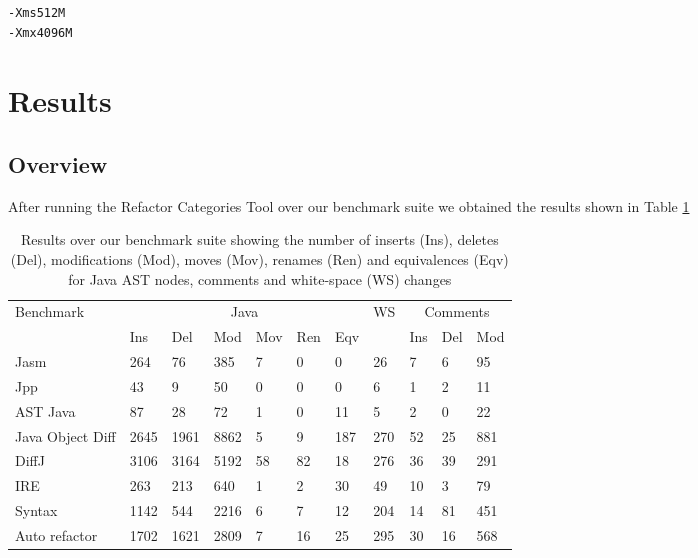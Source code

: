 \begin{verbatim}
-Xms512M 
-Xmx4096M
\end{verbatim}



\section{Results}
\subsection{Overview}
After running the Refactor Categories Tool over our benchmark suite we obtained the results shown in Table \ref{tab:results}

\begin{table}[!p]
    \small
    \begin{tabular}{l|llllll|l|lll}
    Benchmark        & \multicolumn{6}{|c|}{Java}           & WS & \multicolumn{3}{|c}{Comments} \\ \cline{2-7} \cline{9-11}
    ~                & Ins  & Del  & Mod  & Mov & Ren & Eqv & ~          & Ins      & Del & Mod  \\ \hline
    Jasm             & 264  & 76   & 385  & 7   & 0   & 0   & 26         & 7        & 6   & 95   \\
    Jpp              & 43   & 9    & 50   & 0   & 0   & 0   & 6          & 1        & 2   & 11   \\
    AST Java         & 87   & 28   & 72   & 1   & 0   & 11  & 5          & 2        & 0   & 22   \\
    \begin{minipage}[t]{0.15\textwidth}Java Object Diff\end{minipage} & 2645 & 1961 & 8862 & 5   & 9   & 187 & 270        & 52       & 25 & 881 \\
    DiffJ            & 3106 & 3164 & 5192 & 58  & 82  & 18  & 276        & 36       & 39  & 291  \\
    IRE              & 263  & 213  & 640  & 1   & 2   & 30  & 49         & 10       & 3   & 79   \\
    Syntax           & 1142 & 544  & 2216 & 6   & 7   & 12  & 204        & 14       & 81  & 451  \\
    Auto refactor    & 1702 & 1621 & 2809 & 7   & 16  & 25  & 295        & 30       & 16  & 568  \\
    \end{tabular}
    \caption{Results over our benchmark suite showing the number of inserts (Ins), deletes (Del), modifications (Mod), moves (Mov), renames (Ren) and equivalences (Eqv) for Java AST nodes, comments and white-space (WS) changes}
    \label{tab:results}
\end{table}

